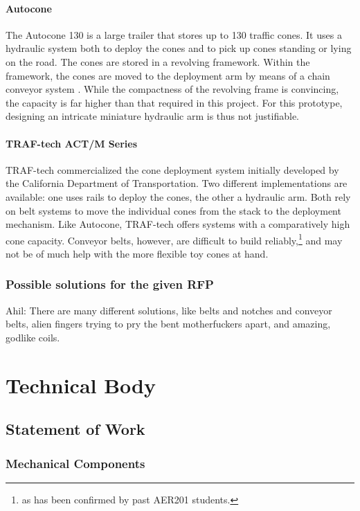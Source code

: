 \documentclass[11pt]{report}
\begin{document}
\subsubsection{Autocone}
The Autocone 130 is a large trailer that stores up to 130 traffic cones. It uses a hydraulic system both to deploy the cones and to pick up cones standing or lying on the road. The cones are stored in a revolving framework. Within the framework, the cones are moved to the deployment arm by means of a chain conveyor system \cite{HowItsMade-Autocone}. While the compactness of the revolving frame is convincing, the capacity is far higher than that required in this project. For this prototype, designing an intricate miniature hydraulic arm is thus not justifiable.

\subsubsection{TRAF-tech ACT/M Series}
TRAF-tech commercialized the cone deployment system initially developed by the California Department of Transportation. Two different implementations are available: one uses rails to deploy the cones, the other a hydraulic arm. Both rely on belt systems to move the individual cones from the stack to the deployment mechanism. Like Autocone, TRAF-tech offers systems with a comparatively high cone capacity. Conveyor belts, however, are difficult to build reliably,\footnote{as has been confirmed by past AER201 students.} and may not be of much help with the more flexible toy cones at hand.


\subsection{Possible solutions for the given RFP}

Ahil: There are many different solutions, like belts and notches and conveyor belts, alien fingers trying to pry the bent motherfuckers apart, and amazing, godlike coils.

\chapter{Technical Body}

\section{Statement of Work}
\subsection{Mechanical Components}
\end{document}
